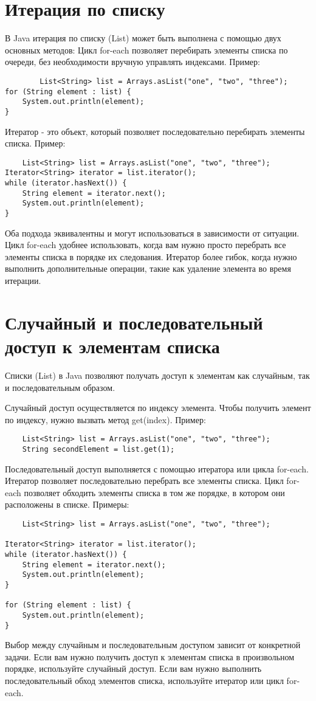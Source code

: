 \section{Итерация по списку}
В Java итерация по списку (List) может быть выполнена с помощью двух основных методов:
Цикл for-each позволяет перебирать элементы списка по очереди, без необходимости вручную управлять индексами. Пример:
    \begin{lstlisting}
        List<String> list = Arrays.asList("one", "two", "three");
for (String element : list) {
    System.out.println(element);
}
    \end{lstlisting}

Итератор - это объект, который позволяет последовательно перебирать элементы списка. Пример:
\begin{lstlisting}
    List<String> list = Arrays.asList("one", "two", "three");
Iterator<String> iterator = list.iterator();
while (iterator.hasNext()) {
    String element = iterator.next();
    System.out.println(element);
}
\end{lstlisting}
Оба подхода эквивалентны и могут использоваться в зависимости от ситуации. Цикл for-each удобнее использовать, когда вам нужно просто перебрать все элементы списка в порядке их следования. Итератор более гибок, когда нужно выполнить дополнительные операции, такие как удаление элемента во время итерации.
\section{Случайный и последовательный доступ к элементам списка}
Списки (List) в Java позволяют получать доступ к элементам как случайным, так и последовательным образом.

Случайный доступ осуществляется по индексу элемента. Чтобы получить элемент по индексу, нужно вызвать метод get(index). Пример:
\begin{lstlisting}
    List<String> list = Arrays.asList("one", "two", "three");
    String secondElement = list.get(1);
\end{lstlisting}
Последовательный доступ выполняется с помощью итератора или цикла for-each. Итератор позволяет последовательно перебрать все элементы списка. Цикл for-each позволяет обходить элементы списка в том же порядке, в котором они расположены в списке. Примеры:
\begin{lstlisting}
    List<String> list = Arrays.asList("one", "two", "three");

Iterator<String> iterator = list.iterator();
while (iterator.hasNext()) {
    String element = iterator.next();
    System.out.println(element);
}

for (String element : list) {
    System.out.println(element);
}
\end{lstlisting}
Выбор между случайным и последовательным доступом зависит от конкретной задачи. Если вам нужно получить доступ к элементам списка в произвольном порядке, используйте случайный доступ. Если вам нужно выполнить последовательный обход элементов списка, используйте итератор или цикл for-each.
